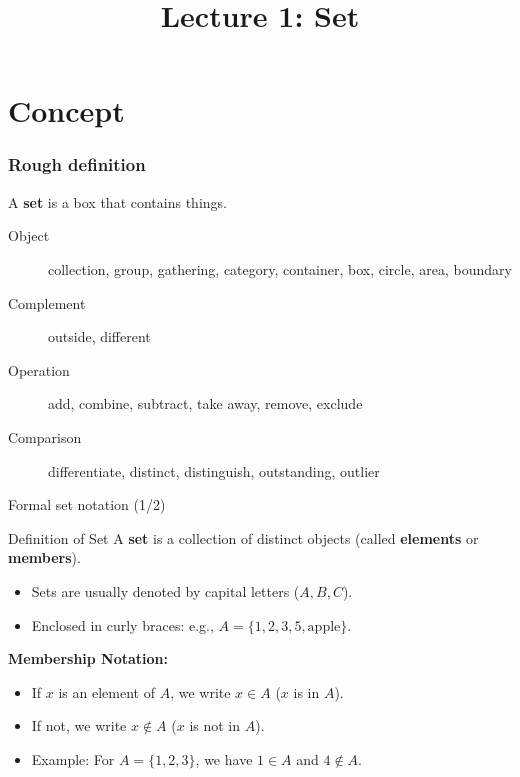 \title{Lecture 1: Set}
\frame{\titlepage}



\section{Concept}
\frame{\sectionpage}

\begin{frame}
\frametitle{Rough definition}
\begin{block}{}
A \textbf{set} is a box that contains things.
\end{block}
\begin{description}
\item[Object] collection, group, gathering, category, container, box, circle, area, boundary 
\item[Complement] outside, different 
\item[Operation] add, combine, subtract, take away, remove, exclude 
\item[Comparison] differentiate, distinct, distinguish, outstanding, outlier 
\end{description}
\end{frame}

\begin{frame}{Formal set notation (1/2)}
\begin{defn}{Definition of Set}{}
A \textbf{set} is a collection of distinct objects (called \textbf{elements} or \textbf{members}). 
\begin{itemize}
\item Sets are usually denoted by capital letters ($A, B, C$).
\item Enclosed in curly braces: e.g., $A = \{1, 2, 3, 5, \text{apple}\}$.
\end{itemize}
\tcblower
\textbf{Membership Notation:}
\begin{itemize}
\item If $x$ is an element of $A$, we write $x \in A$ ($x$ is in $A$). 
\item If not, we write $x \notin A$ ($x$ is not in $A$). 
\item Example: For $A = \{1, 2, 3\}$, we have $1 \in A$ and $4 \notin A$.
\end{itemize}
\end{defn}
\end{frame}


